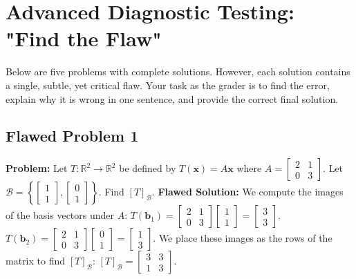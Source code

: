 \documentclass[11pt, a4paper]{article}
\theoremstyle{definition}
\theoremstyle{remark}
\newcommand{\R}{\mathbb{R}}
\begin{document}
\newpage
\section{Advanced Diagnostic Testing: "Find the Flaw"}

Below are five problems with complete solutions. However, each solution contains a single, subtle, yet critical flaw. Your task as the grader is to find the error, explain why it is wrong in one sentence, and provide the correct final solution.

\subsection{Flawed Problem 1}
\textbf{Problem:} Let $T: \R^2 \to \R^2$ be defined by $T(\mathbf{x}) = A\mathbf{x}$ where $A = \begin{bmatrix} 2 & 1 \\ 0 & 3 \end{bmatrix}$. Let $\mathcal{B} = \left\{ \begin{bmatrix} 1 \\ 1 \end{bmatrix}, \begin{bmatrix} 0 \\ 1 \end{bmatrix} \right\}$. Find $[T]_\mathcal{B}$.
\textbf{Flawed Solution:}
We compute the images of the basis vectors under $A$:
$T(\mathbf{b}_1) = \begin{bmatrix} 2 & 1 \\ 0 & 3 \end{bmatrix} \begin{bmatrix} 1 \\ 1 \end{bmatrix} = \begin{bmatrix} 3 \\ 3 \end{bmatrix}$.
$T(\mathbf{b}_2) = \begin{bmatrix} 2 & 1 \\ 0 & 3 \end{bmatrix} \begin{bmatrix} 0 \\ 1 \end{bmatrix} = \begin{bmatrix} 1 \\ 3 \end{bmatrix}$.
We place these images as the rows of the matrix to find $[T]_\mathcal{B}$:
$[T]_\mathcal{B} = \begin{bmatrix} 3 & 3 \\ 1 & 3 \end{bmatrix}$.
\end{document}
